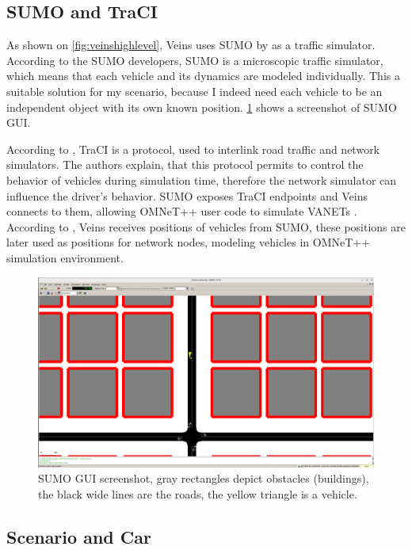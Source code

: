 \documentclass[]{nsm-thesis}
\begin{document}
\subsection{SUMO and TraCI}
As shown on \ref{fig:veinshighlevel}, Veins uses SUMO by \textcite[Page~218]{sumo2018} as a traffic simulator. According to the SUMO developers, SUMO is a microscopic traffic simulator, which means that each vehicle and its dynamics are modeled individually.
This a suitable solution for my scenario, because I indeed need each vehicle to be an independent object with its own known position. \cref{fig:sumogui} shows a screenshot of SUMO \ac{GUI}.

According to \textcite{traci}, \ac{TraCI} is a protocol, used to interlink road traffic and network simulators. The authors explain, that this protocol permits to control the behavior of vehicles during simulation time, therefore the network simulator can influence the driver's behavior. SUMO exposes \ac{TraCI} endpoints \cite{sumotraci} and Veins connects to them, allowing OMNeT++ user code to simulate \acp{VANET} \cite[Pages~217-218]{Sommer2019}. According to \textcite{Sommer2019}, Veins receives positions of vehicles from SUMO, these positions are later used as positions for network nodes, modeling vehicles in OMNeT++ simulation environment.

\begin{figure}
	\centering
	\includegraphics[width=1\textwidth]{figures/SUMO-GUI.png}
	\caption{SUMO \ac{GUI} screenshot, gray rectangles depict obstacles (buildings), the black wide lines are the roads, the yellow triangle is a vehicle.}
	\label{fig:sumogui}
\end{figure}



\subsection {Scenario and Car}
\label{sec:scenarioned}
\end{document}

